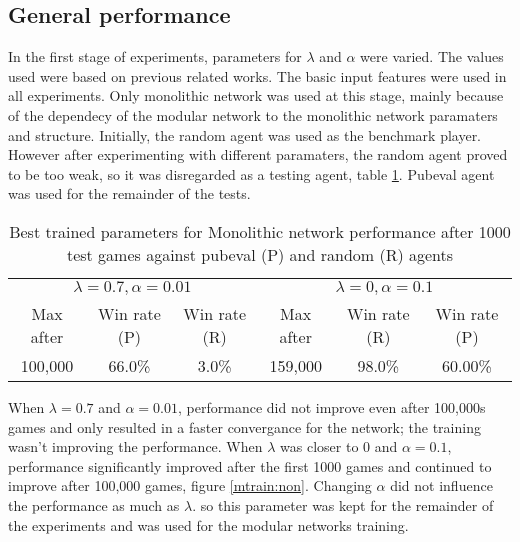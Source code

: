 \documentclass[12pt,a4paper]{article}
\begin{document}
\subsection{General performance}
In the first stage of experiments, parameters for $\lambda$ and $\alpha$ were varied. The values used were based on previous related works. The basic input features were used in all experiments. Only monolithic network was used at this stage, mainly because of the dependecy of the modular network to the monolithic network paramaters and structure. Initially, the random agent was used as the benchmark player. However after experimenting with different paramaters, the random agent proved to be too weak, so it was disregarded as a testing agent, table \ref{rp}. Pubeval agent was used for the remainder of the tests.
\begin{table}[htb]
    \centering
    \caption{Best trained parameters for Monolithic network performance after 1000 test games against pubeval (P) and random (R) agents}
    \label{rp}
    \begin{tabular}{ccc|ccc}
        \hline
        \hline
        \multicolumn{3}{c|}{$\lambda=0.7, \alpha=0.01$} & \multicolumn{3}{|c}{$\lambda=0, \alpha=0.1$} \\
        Max after & Win rate (P) & Win rate (R) & Max after & Win rate (R) & Win rate (P)  \\ 
        \hline
        100,000 & 66.0\% & 3.0\% & 159,000 & 98.0\% & 60.00\% \\ 
        \hline
    \end{tabular}
\end{table}

When $\lambda=0.7$ and $\alpha=0.01$, performance did not improve even after 100,000s games and only resulted in a faster convergance for the network; the training wasn't improving the performance. When $\lambda$ was closer to 0 and $\alpha=0.1$, performance significantly improved after the first 1000 games and continued to improve after 100,000 games, figure \ref{mtrain:non}. Changing $\alpha$ did not influence the performance as much as $\lambda$. so this parameter was kept for the remainder of the experiments and was used for the modular networks training.
\end{document}
